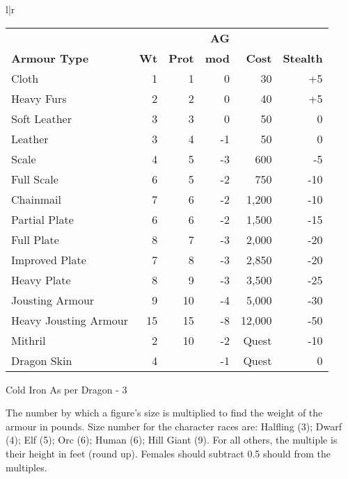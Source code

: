 \begin{tabular}[t]{l|r}
\begin{minipage}[t]{4.6in}
\begin{tabularx}{\linewidth}{Xrrrrr}
	&	&	& \textbf{AG} & & \\
\textbf{Armour Type} & \textbf{Wt} & \textbf{Prot} & \textbf{mod} &
\textbf{Cost} & \textbf{Stealth} \\ \hline
Cloth			& 1 &  1 &  0 &     30 & +5 \\ \hline
Heavy Furs		& 2 &  2 &  0 &     40 & +5 \\ \hline
Soft Leather		& 3 &  3 &  0 &     50 &  0 \\ \hline
Leather			& 3 &  4 & -1 &     50 &  0 \\ \hline
Scale\dag		& 4 &  5 & -3 &    600 & -5 \\ \hline
Full Scale\dag		& 6 &  5 & -2 &    750 & -10 \\ \hline
Chainmail\dag		& 7 &  6 & -2 &  1,200 & -10 \\ \hline
Partial Plate\dag	& 6 &  6 & -2 &  1,500 & -15 \\ \hline
Full Plate\dag		& 8 &  7 & -3 &  2,000 & -20 \\ \hline
Improved Plate\dag	& 7 &  8 & -3 &  2,850 & -20 \\ \hline
Heavy Plate\dag		& 8 &  9 & -3 &  3,500 & -25 \\ \hline
Jousting Armour\dag	& 9 & 10 & -4 &  5,000 & -30 \\ \hline
Heavy Jousting Armour\dag & 15 & 15 & -8 & 12,000 & -50 \\ \hline
Mithril			& 2 & 10 & -2 & Quest & -10 \\ \hline
Dragon Skin		& 4 & \ddag & -1 & Quest & 0 \\ \hline
\end{tabularx}
\begin{flushleft}
\dag Cold Iron \hspace{2.0em}\ddag As per Dragon - 3 \\
\end{flushleft}

\begin{multicols}{2}
{\setlength\leftmargini{0pt}
\begin{description}
\setlength\itemsep{0pt}
\item[Weight] The number by which a figure's size is multiplied to
find the weight of the armour in pounds.  Size number for the
character races are: Halfling (3); Dwarf (4); Elf (5); Orc (6); Human
(6); Hill Giant (9).  For all others, the multiple is their height in
feet (round up).  Females should subtract 0.5 should from the
multiples.


\end{description}}
\end{multicols}
\end{minipage}
\end{tabular}
